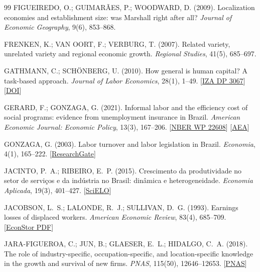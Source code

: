 \documentclass[11pt,a4paper]{article}
\begin{document}
{\begin{thebibliography}{99}
FIGUEIREDO, O.; GUIMAR\~AES, P.; WOODWARD, D. (2009). Localization economies and establishment size: was Marshall right after all? \textit{Journal of Economic Geography}, 9(6), 853--868.

FRENKEN, K.; VAN OORT, F.; VERBURG, T. (2007). Related variety, unrelated variety and regional economic growth. \textit{Regional Studies}, 41(5), 685--697.

GATHMANN, C.; SCH\"ONBERG, U. (2010). How general is human capital? A task-based approach. \textit{Journal of Labor Economics}, 28(1), 1--49. [\href{https://ideas.repec.org/p/iza/izadps/dp3067.html}{IZA DP 3067}] [\href{https://doi.org/10.1086/649786}{DOI}]

GERARD, F.; GONZAGA, G. (2021). Informal labor and the efficiency cost of social programs: evidence from unemployment insurance in Brazil. \textit{American Economic Journal: Economic Policy}, 13(3), 167--206. [\href{https://www.nber.org/papers/w22608}{NBER WP 22608}] [\href{https://www.aeaweb.org/articles?id=10.1257/pol.20180072}{AEA}]

GONZAGA, G. (2003). Labor turnover and labor legislation in Brazil. \textit{Economia}, 4(1), 165--222. [\href{https://www.researchgate.net/publication/24124235_Labor_Turnover_and_Labor_Legislation_in_Brazil}{ResearchGate}]

JACINTO, P.~A.; RIBEIRO, E.~P. (2015). Crescimento da produtividade no setor de servi\c{c}os e da ind\'ustria no Brasil: din\^amica e heterogeneidade. \textit{Economia Aplicada}, 19(3), 401--427. [\href{https://doi.org/10.1590/1413-8050/ea119450}{SciELO}]

JACOBSON, L.~S.; LALONDE, R.~J.; SULLIVAN, D.~G. (1993). Earnings losses of displaced workers. \textit{American Economic Review}, 83(4), 685--709. [\href{https://www.econstor.eu/bitstream/10419/172346/1/wp1992-11.pdf}{EconStor PDF}]

JARA-FIGUEROA, C.; JUN, B.; GLAESER, E.~L.; HIDALGO, C.~A. (2018). The role of industry-specific, occupation-specific, and location-specific knowledge in the growth and survival of new firms. \textit{PNAS}, 115(50), 12646--12653. [\href{https://doi.org/10.1073/pnas.1800475115}{PNAS}]


\end{thebibliography}}
\end{document}
